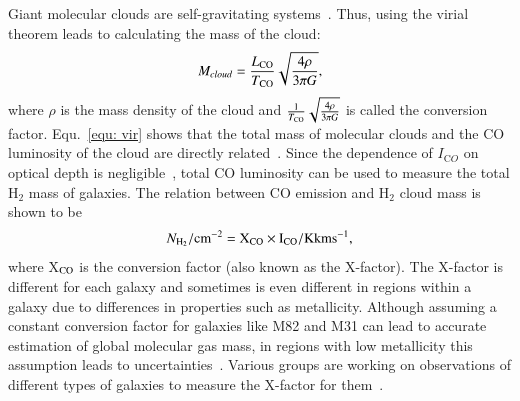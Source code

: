 Giant molecular clouds are self-gravitating systems~\citep[e.g.][]{Efstathiou83,Blitz99}.
Thus, using the virial theorem leads to calculating the mass of the cloud: 
\begin{equation}
 \label{equ: vir}
 M_{cloud} = \frac{L_{\rm CO}}{T_{\rm CO}} \sqrt{\frac{4\rho}{3\pi G }},
\end{equation}
where $\rho$ is the mass density of the cloud and $\frac{1}{T_{\rm CO}}\sqrt{\frac{4\rho}{3\pi G}}$ is called the conversion factor.
Equ.~\ref{equ: vir} shows that the total mass of molecular clouds and the CO luminosity of the cloud are directly related~\citep{Young91}. 
Since the dependence of $I_{\mathrm CO}$ on optical depth is negligible~\citep{Krumholz09}, total CO luminosity can be used to measure the total H$_2$ mass of galaxies.
The relation between CO emission and H$_2$ cloud mass is shown to be
\begin{equation}
N_{\rm H_2}/\rm cm^{-2} = X_{\rm CO} \times I_{\rm CO}/{\rm K km s}^{-1},
\end{equation}
where X$_{\rm CO}$ is the conversion factor (also known as the X-factor).
The X-factor is different for each galaxy and sometimes is even different in regions within a galaxy due to differences in properties such as metallicity.
Although assuming a constant conversion factor for galaxies like M82 and M31 can lead to accurate estimation of global molecular gas mass, in regions with low metallicity this assumption leads to uncertainties~\citep{Bolato13}. 
Various groups are working on observations of different types of galaxies to measure the X-factor for them~\citep{Wilson95, Bosselli02, Bolato13}.


